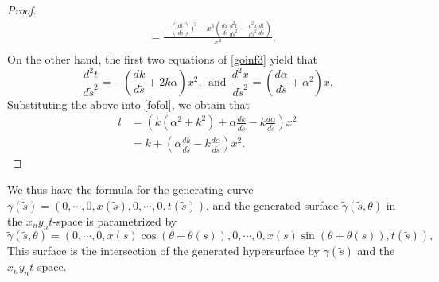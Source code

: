 \documentclass[12pt]{amsart}
\theoremstyle{definition}\newtheorem{exa}[thm]{\sc Example}
\theoremstyle{definition}\newtheorem{de}[thm]{\sc Definition}
\theoremstyle{definition}\newtheorem{rem}[thm]{\sc Remark}
\theoremstyle{definition}\newtheorem{prob}[thm]{\it Problem}
\theoremstyle{definition}\newtheorem{fact}[thm]{\sc Fact}
\theoremstyle{definition}\newtheorem{claim}[thm]{\sc Claim}
\numberwithin{equation}{section}
\begin{document}
\begin{proof}
\begin{equation}
\begin{split}
&=\frac{-\left(\frac{dt}{d\tilde{s}}\right))^3-x^3\left(\frac{dx}{d\tilde{s}}\frac{d^2t}{d\tilde{s}^2}-\frac{d^2x}{d\tilde{s}^2}\frac{dt}{d\tilde{s}}\right)}{x^4}.\\
\end{split}
\end{equation}
On the other hand, the first two equations of \eqref{goinf3} yield that
\[\frac{d^2 t}{d\tilde{s}^2}=-\left(\frac{dk}{d\tilde{s}}+2k\alpha\right)x^2,\ \ \textrm{and}\ \ \frac{d^2x}{d\tilde{s}^2}=\left(\frac{d\alpha}{d\tilde{s}}+\alpha^2\right)x.\]
Substituting the above into \eqref{fofol}, we obtain that
\begin{equation}
\begin{split}
l&=\left(k(\alpha^2+k^2)+\alpha\frac{dk}{d\tilde{s}}-k\frac{d\alpha}{d\tilde{s}}\right)x^2\\
&=k+\left(\alpha\frac{dk}{d\tilde{s}}-k\frac{d\alpha}{d\tilde{s}}\right)x^2.
\end{split}
\end{equation}
\end{proof}

We thus have the formula for the generating curve  $\gamma(\tilde{s})=(0,\cdots,0,x(\tilde{s}),0,\cdots,0,t(\tilde{s}))$,
and the generated surface $\tilde{\gamma}(\tilde{s},\theta)$ in the $x_{n}y_{n}t$-space is parametrized by
\[\tilde{\gamma}(\tilde{s},\theta)=(0,\cdots,0,x(s)\cos{(\theta+\theta(s))},0,\cdots,0,x(s)\sin{(\theta+\theta(s))},t(\tilde{s})),\]
This surface is the intersection of the generated hypersurface by $\gamma(\tilde{s})$ and the $x_{n}y_{n}t$-space.
\end{document}
